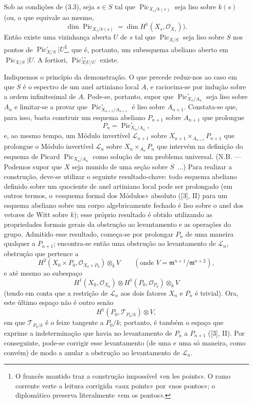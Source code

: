  Sob as condições de (3.3), seja $s\in S$ tal que
$\operatorname{Pic}_{X_s/k(s)}$ seja liso sobre $k(s)$ (ou, o que equivale ao
mesmo,
\[
\dim\operatorname{Pic}_{X_s/k(s)}=\dim H^1(X_s,\mathcal O_{X_s})).
\]
Então existe uma vizinhança aberta $U$ de $s$ tal que
$\operatorname{Pic}_{X/S}$ seja liso sobre $S$ nos pontos de
$\operatorname{Pic}_{X/S}^\circ|U$\footnote{O francês mantido traz a
construção impossível «en les points». O ramo corrente verte a leitura
corrigida «aux points» por «nos pontos»; o diplomático preserva literalmente
«em os pontos».}, que é, portanto, um subesquema abeliano aberto em
$\operatorname{Pic}_{X/S}|U$. A fortiori,
$\operatorname{Pic}_{X|U/U}^{\circ\circ}$ existe.

Indiquemos o princípio da demonstração. O que precede reduz-nos ao caso em que
$S$ é o espectro de um anel artiniano local $A$, e raciocina-se por indução
sobre a ordem infinitesimal de $A$. Pode-se, portanto, supor que
$\operatorname{Pic}_{X_n/A_n}^\circ$ seja liso sobre $A_n$ e limitar-se a
provar que $\operatorname{Pic}_{X_{n+1}/A_{n+1}}^\circ$ é liso sobre
$A_{n+1}$. Constata-se que, para isso, basta construir um esquema abeliano
$P_{n+1}$ sobre $A_{n+1}$ que prolongue
\[
P_n=\operatorname{Pic}_{X_n/A_n}^\circ,
\]
e, ao mesmo tempo, um Módulo invertível $\mathcal L_{n+1}$ sobre
$X_{n+1}\times_{A_{n+1}}P_{n+1}$ que prolongue o Módulo invertível
$\mathcal L_n$ sobre $X_n\times_{A_n}P_n$ que intervém na definição do esquema
de Picard $\operatorname{Pic}_{X_n/A_n}$ como solução de um problema universal.
(N.B. --- Podemos supor que $X$ seja munido de uma seção sobre $S$~...) Para
realizar a construção, deve-se utilizar o seguinte resultado-chave: todo
esquema abeliano definido sobre um quociente de anel artiniano local pode ser
prolongado (em outros termos, o «esquema formal dos Módulos» absoluto ([3], II)
para um esquema abeliano sobre um corpo algebricamente fechado é liso sobre o
anel dos
vetores de Witt sobre $k$); esse próprio resultado é obtido utilizando as
propriedades formais gerais da obstrução ao levantamento e as operações do
grupo. Admitido esse resultado, começa-se por prolongar $P_n$ de uma maneira
qualquer a $P_{n+1}$; encontra-se então uma obstrução ao levantamento de
$\mathcal L_n$, obstrução que pertence a
\[
H^2(X_0\times P_0,\mathcal O_{X_0\times P_0})\otimes_k V
\qquad(\text{onde }V=\mathfrak m^{n+1}/\mathfrak m^{n+2}),
\]
e até mesmo ao subespaço
\[
H^1(X_0,\mathcal O_{X_0})\otimes
H^1(P_0,\mathcal O_{P_0})\otimes_k V
\]
(tendo em conta que a restrição de $\mathcal L_n$ aos dois fatores $X_n$ e
$P_n$ é trivial). Ora, este último espaço não é outro senão
\[
H^1(P_0,\mathcal T_{P_0/k})\otimes V,
\]
em que $\mathcal T_{P_0/k}$ é o feixe tangente a $P_0/k$; portanto, é também o
espaço que exprime a indeterminação que havia no levantamento de $P_n$ a
$P_{n+1}$ ([3], II). Por conseguinte, pode-se corrigir esse levantamento (de
uma e uma só maneira, como convém) de modo a anular a obstrução ao levantamento
de $\mathcal L_n$.

